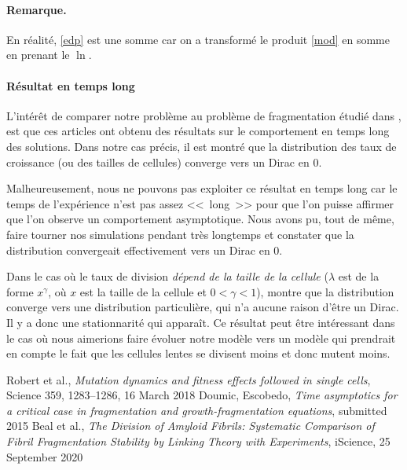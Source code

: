 \documentclass[12pt]{article}
\newcommand{\req}[1]{\paragraph{Remarque.}#1\vspace{0.1cm}}
\begin{document}
\req{En réalité, \eqref{edp} est une somme car on a transformé le produit \eqref{mod} en somme en prenant le $\ln$.}


\paragraph{Résultat en temps long} L'intérêt de comparer notre problème au problème de fragmentation étudié dans \cite{md1}, \cite{md2} est que ces articles ont obtenu des résultats sur le comportement en temps long des solutions. Dans notre cas précis, il est montré que la distribution des taux de croissance (ou des tailles de cellules) converge vers un Dirac en 0. 

Malheureusement, nous ne pouvons pas exploiter ce résultat en temps long car le temps de l'expérience n'est pas assez <<~long~>> pour que l'on puisse affirmer que l'on observe un comportement asymptotique. Nous avons pu, tout de même, faire tourner nos simulations pendant très longtemps et constater que la distribution convergeait effectivement vers un Dirac en 0.

Dans le cas où le taux de division \emph{dépend de la taille de la cellule} ($\lambda$ est de la forme $x^{\gamma}$, où $x$ est la taille de la cellule et $0<\gamma<1$), \cite{md2} montre que la distribution converge vers une distribution particulière, qui n'a aucune raison d'être un Dirac. Il y a donc une stationnarité qui apparaît. Ce résultat peut être intéressant dans le cas où nous aimerions faire évoluer notre modèle vers un modèle qui prendrait en compte le fait que les cellules lentes se divisent moins et donc mutent moins.




\begin{thebibliography}{1}

  Robert et al.,
  \emph{Mutation dynamics and fitness effects followed in single cells}, Science 359, 1283–1286, 16 March 2018
  Doumic, Escobedo,
  \emph{Time asymptotics for a critical case in fragmentation and growth-fragmentation equations}, submitted 2015
  Beal et al.,
  \emph{The Division of Amyloid Fibrils: Systematic Comparison of Fibril Fragmentation Stability by Linking Theory with Experiments}, iScience, 25 September 2020
\end{thebibliography}
\end{document}
